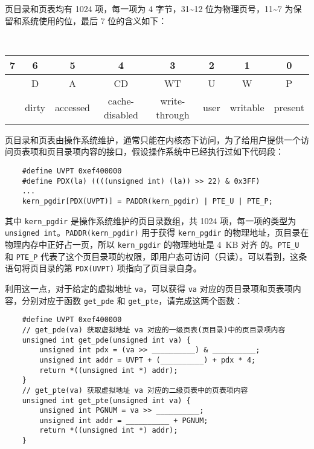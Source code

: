 \begin{problems}
        页目录和页表均有 1024 项，每一项为 4 字节，31\textasciitilde 12 位为物理页号，11\textasciitilde 7 为保留和系统使用的位，最后 7 位的含义如下：
        \begin{table}[H]
            \tt
            \centering
            \begin{tabular}{cccccccc}
                {\footnotesize 7} & {\footnotesize 6} & {\footnotesize 5} & {\footnotesize 4} & {\footnotesize 3} & {\footnotesize 2} & {\footnotesize 1} & {\footnotesize 0} \\ \hline
                \multicolumn{1}{|c|}{\cellcolor{gray!50}} & \multicolumn{1}{c|}{D} & \multicolumn{1}{c|}{A} & \multicolumn{1}{c|}{CD} & \multicolumn{1}{c|}{WT} & \multicolumn{1}{c|}{U} & \multicolumn{1}{c|}{W} & \multicolumn{1}{c|}{P} \\ \hline
                & {\footnotesize dirty} & {\footnotesize accessed} & {\footnotesize cache-disabled} & {\footnotesize write-through} & {\footnotesize user} & {\footnotesize writable} & {\footnotesize present}
            \end{tabular}
        \end{table}

        页目录和页表由操作系统维护，通常只能在内核态下访问，为了给用户提供一个访问页表项和页目录项内容的接口，假设操作系统中已经执行过如下代码段：
        \begin{verbatim}
    #define UVPT 0xef400000
    #define PDX(la) ((((unsigned int) (la)) >> 22) & 0x3FF)
    ...
    kern_pgdir[PDX(UVPT)] = PADDR(kern_pgdir) | PTE_U | PTE_P;
        \end{verbatim}
        其中 \verb|kern_pgdir| 是操作系统维护的页目录数组，共 1024 项，每一项的类型为 \verb|unsigned int|。\verb|PADDR(kern_pgdir)| 用于获得 \verb|kern_pgdir| 的物理地址，页目录在物理内存中正好占一页，所以 \verb|kern_pgdir| 的物理地址是 \SI{4}{KB} 对齐 的。\verb|PTE_U| 和 \verb|PTE_P| 代表了这个页目录项的权限，即用户态可访问（只读）。可以看到，这条语句将页目录的第 \verb|PDX(UVPT)| 项指向了页目录自身。
        
        利用这一点，对于给定的虚拟地址 \verb|va|，可以获得 \verb|va| 对应的页目录项和页表项内容，分别对应于函数 \verb|get_pde| 和 \verb|get_pte|，请完成这两个函数：
        \begin{verbatim}
    #define UVPT 0xef400000
    // get_pde(va) 获取虚拟地址 va 对应的一级页表(页目录)中的页目录项内容
    unsigned int get_pde(unsigned int va) {
        unsigned int pdx = (va >> __________) & __________;
        unsigned int addr = UVPT + (__________) + pdx * 4;
        return *((unsigned int *) addr);
    }
    // get_pte(va) 获取虚拟地址 va 对应的二级页表中的页表项内容
    unsigned int get_pte(unsigned int va) {
        unsigned int PGNUM = va >> __________;
        unsigned int addr = __________ + PGNUM;
        return *((unsigned int *) addr);
    }
        \end{verbatim}
    \end{problems}